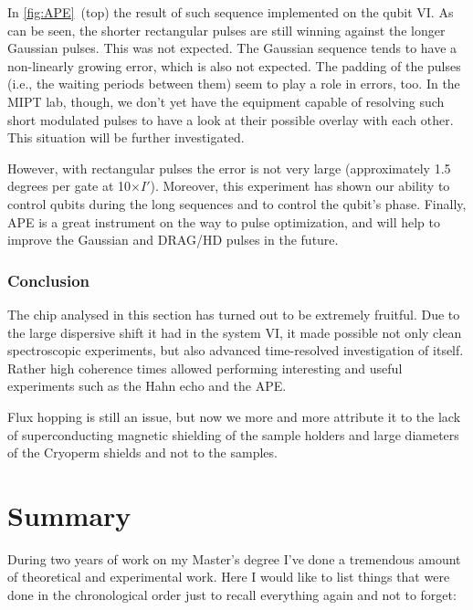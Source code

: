 \documentclass[12pt, twoside]{report}
\numberwithin{equation}{section}
\begin{document}
In  \autoref{fig:APE}~(top) the result of such sequence implemented on the qubit VI. As can be seen, the shorter rectangular pulses are still winning against the longer Gaussian pulses. This was not expected. The Gaussian sequence tends to have a non-linearly growing error, which is also not expected. The padding of the pulses (i.e., the waiting periods between them) seem to play a role in errors, too. In the MIPT lab, though, we don't yet have the equipment capable of resolving such short modulated pulses to have a look at their possible overlay with each other. This situation will be further investigated.

However, with rectangular pulses the error is not very large (approximately 1.5 degrees per gate at 10$\times I'$). Moreover, this experiment has shown our ability to control qubits during the long sequences and to control the qubit's phase. Finally, APE is a great instrument on the way to pulse optimization, and will help to improve the Gaussian and DRAG/HD pulses in the future.

\subsection{Conclusion}

The chip analysed in this section has turned out to be extremely fruitful. Due to the large dispersive shift it had in the system VI, it made possible not only clean spectroscopic experiments, but also advanced time-resolved investigation of itself. Rather high coherence times allowed performing interesting and useful experiments such as the Hahn echo and the APE. 

Flux hopping is still an issue, but now we more and more attribute it to the lack of superconducting magnetic shielding of the sample holders and large diameters of the Cryoperm shields and not to the samples.

\chapter{Summary}

During two years of work on my Master's degree I've done a tremendous amount of theoretical and experimental work. Here I would like to list things that were done in the chronological order just to recall everything again and not to forget:
\end{document}
